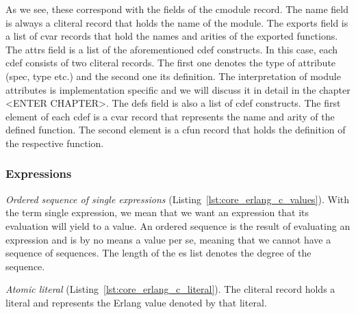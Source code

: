 As we see, these correspond with the fields of the c\textunderscore module record. The name
field is always a c\textunderscore literal record that holds the name of the module. The
exports field is a list of c\textunderscore var records that hold the names and arities of the
exported functions. The attrs field is a list of the aforementioned c\textunderscore def
constructs. In this case, each c\textunderscore def consists of two c\textunderscore literal records. The
first one denotes the type of attribute (spec, type etc.) and the second one
its definition. The interpretation of module attributes is implementation
specific and we will discuss it in detail in the chapter <ENTER CHAPTER>. The
defs field is also a list of c\textunderscore def constructs. The first element of each c\textunderscore def
is a c\textunderscore var record that represents the name and arity of the defined function.
The second element is a c\textunderscore fun record that holds the definition of the
respective function.

\subsubsection{Expressions}


\emph{Ordered sequence of single expressions} (Listing~\ref{lst:core_erlang_c_values}).
With the term single expression, we mean that we want an expression that its
evaluation will yield to a value. An ordered sequence is the result of
evaluating an expression and is by no means a value per se, meaning that we
cannot have a sequence of sequences. The length of the es list denotes the
degree of the sequence.



\emph{Atomic literal} (Listing~\ref{lst:core_erlang_c_literal}).
The c\textunderscore literal record holds a  literal and represents the Erlang value denoted
by that literal.


